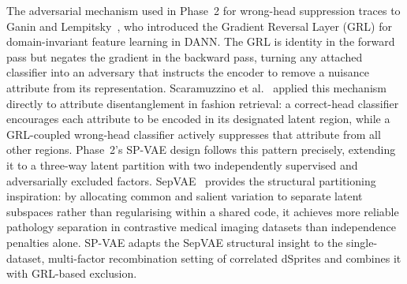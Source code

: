 The adversarial mechanism used in Phase~2 for wrong-head suppression traces to Ganin and
Lempitsky~\citep{ganin2015unsupervised, ganin2016domain}, who introduced the Gradient
Reversal Layer (GRL) for domain-invariant feature learning in DANN. The GRL is identity
in the forward pass but negates the gradient in the backward pass, turning any attached
classifier into an adversary that instructs the encoder to remove a nuisance attribute
from its representation. Scaramuzzino et al.~\citep{attribute_disentanglement} applied
this mechanism directly to attribute disentanglement in fashion retrieval: a correct-head
classifier encourages each attribute to be encoded in its designated latent region, while
a GRL-coupled wrong-head classifier actively suppresses that attribute from all other
regions. Phase~2's SP-VAE design follows this pattern precisely, extending it to a
three-way latent partition with two independently supervised and adversarially excluded
factors. SepVAE~\citep{louiset2024sepvae} provides the structural partitioning inspiration:
by allocating common and salient variation to separate latent subspaces rather than
regularising within a shared code, it achieves more reliable pathology separation in
contrastive medical imaging datasets than independence penalties alone. SP-VAE adapts
the SepVAE structural insight to the single-dataset, multi-factor recombination setting
of correlated dSprites and combines it with GRL-based exclusion.
